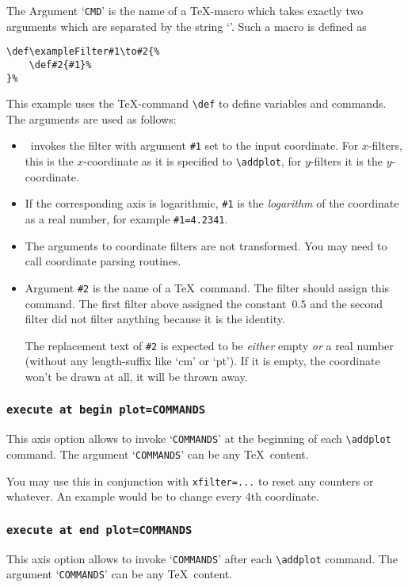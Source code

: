 The Argument `\texttt{CMD}' is the name of a \TeX-macro which takes exactly two arguments which are separated by the string `\texttt{\string\to}'. Such a macro is defined as
\begin{lstlisting}
\def\exampleFilter#1\to#2{%
	\def#2{#1}%
}%
\end{lstlisting}
This example uses the \TeX-command \lstinline!\def! to define variables and commands. The arguments are used as follows:
\begin{itemize}
	\item \PGFPlots\ invokes the filter with argument \texttt{\#1} set to the input coordinate. For $x$-filters, this is the $x$-coordinate as it is specified to \lstinline!\addplot!, for $y$-filters it is the $y$-coordinate.
	\item If the corresponding axis is logarithmic, \texttt{\#1} is the \emph{logarithm} of the coordinate as a real number, for example \texttt{\#1=4.2341}.
	\item The arguments to coordinate filters are not transformed. You may need to call coordinate parsing routines.
	\item Argument \texttt{\#2} is the name of a \TeX\ command. The filter should assign this command. The first filter above assigned the constant~$0.5$ and the second filter did not filter anything because it is the identity.

	The replacement text of \texttt{\#2} is expected to be \emph{either} empty \emph{or} a real number (without any length-suffix like `cm' or `pt'). If it is empty, the coordinate won't be drawn at all, it will be thrown away.
\end{itemize}

\subsubsection{\texttt{execute at begin plot=COMMANDS}}
This axis option allows to invoke `\texttt{COMMANDS}' at the beginning of each \lstinline!\addplot! command. The argument `\texttt{COMMANDS}' can be any \TeX\ content.

You may use this in conjunction with \texttt{xfilter=...} to reset any counters or whatever. An example would be to change every 4th coordinate.

\subsubsection{\texttt{execute at end plot=COMMANDS}}
This axis option allows to invoke `\texttt{COMMANDS}' after each \lstinline!\addplot! command. The argument `\texttt{COMMANDS}' can be any \TeX\ content.
